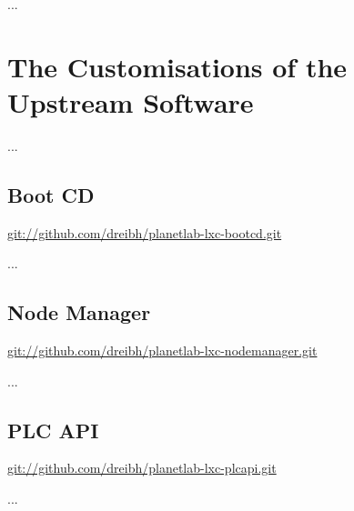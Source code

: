 ...




\chapter[The \noun{NorNet} Customisations]{The  Customisations of the Upstream  Software}
\label{cha:The-NorNet-Customisations-of-the-PlanetLab-Software}

...

\section{Boot CD}

\url{git://github.com/dreibh/planetlab-lxc-bootcd.git}

...


\section{Node Manager}

\url{git://github.com/dreibh/planetlab-lxc-nodemanager.git}

...


\section{PLC API}

\url{git://github.com/dreibh/planetlab-lxc-plcapi.git}

...


% 



